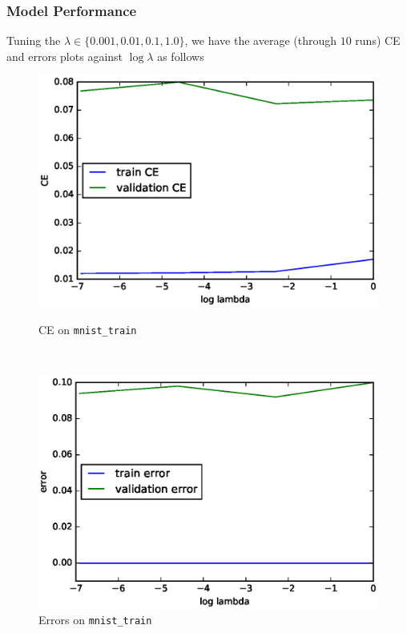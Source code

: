 \documentclass[10pt]{article}
\begin{document}
\subsubsection{Model Performance}
Tuning the $\lambda \in \{0.001, 0.01, 0.1, 1.0\}$, we have the average (through $10$ runs) CE and errors plots against $\log\lambda$ as follows
\begin{figure}[H]
\centering
\begin{minipage}[b]{0.45\textwidth}
\centering
\includegraphics[scale=.5]{plot_big_ce_pen.eps}
\caption{CE on \texttt{mnist\_train}}
\label{plot_big_ce_pen}
\end{minipage}
\
\begin{minipage}[b]{0.45\textwidth}
\centering
\includegraphics[scale=.5]{plot_big_err_pen.eps}
\caption{Errors on \texttt{mnist\_train}}
\label{plot_big_err_pen}
\end{minipage}
\end{figure}
\end{document}
